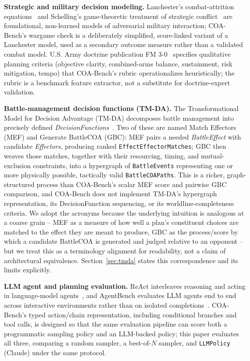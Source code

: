 \documentclass[sigconf]{acmart}
\begin{document}
\textbf{Strategic and military decision modeling.} Lanchester's combat-attrition equations~\cite{lanchester1916} and Schelling's game-theoretic treatment of strategic conflict~\cite{schelling1960} are foundational, non-learned models of adversarial military interaction; COA-Bench's wargame check is a deliberately simplified, score-linked variant of a Lanchester model, used as a secondary outcome measure rather than a validated combat model. U.S. Army doctrine publication FM 3-0~\cite{fm30} specifies qualitative planning criteria (objective clarity, combined-arms balance, sustainment, risk mitigation, tempo) that COA-Bench's rubric operationalizes heuristically; the rubric is a benchmark feature extractor, not a substitute for doctrine-expert validation.

\textbf{Battle-management decision functions (TM-DA).} The Transformational Model for Decision Advantage (TM-DA) decomposes battle management into precisely defined \emph{DecisionFunctions}~\cite{tmda2025bootcamp}. Two of these are named Match Effectors (MEF) and Generate BattleCOA (GBC): MEF pairs a needed \emph{BattleEffect} with candidate \emph{Effectors}, producing ranked \texttt{EffectEffectorMatches}; GBC then weaves those matches, together with their resourcing, timing, and mutual-exclusion constraints, into a hypergraph of \texttt{BattleEvents} representing one or more physically possible, tactically valid \texttt{BattleCOAPaths}. This is a richer, graph-structured process than COA-Bench's scalar MEF score and pairwise GBC comparison, and COA-Bench does not implement TM-DA's hypergraph representation, its DecisionFunction sequencing, or its worldline-completeness criteria. We adopt the acronyms because the underlying intuition is analogous at a coarse grain -- MEF as a measure of how well a plan's constituent choices are matched to the effect they are meant to produce, GBC as the process/score by which a candidate BattleCOA is generated and judged relative to an opponent -- but we treat this as a terminology alignment for readability, not a claim of architectural equivalence. Section~\ref{sec:tmda} states this correspondence and its limits explicitly.

\textbf{LLM agent and planning evaluation.} ReAct interleaves reasoning and acting in language-model agents~\cite{yao2023react}, and AgentBench evaluates LLM agents end to end across interactive environments rather than on isolated completions~\cite{liu2024agentbench}. COA-Bench's typed action/chain representation, including conditional branches and tool calls, is designed so that the same evaluation pipeline can score both a programmatic sampling policy and an LLM-backed policy; this paper evaluates all three, comparing a random sampler, a best-of-$N$ sampler, and \texttt{LLMPolicy} (Claude) under the same protocol.
\end{document}
